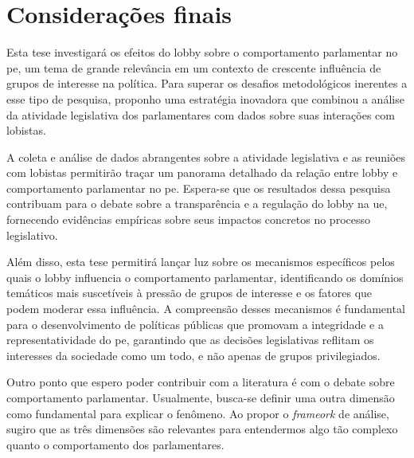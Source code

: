 \chapter{Considerações finais}
\label{chapter:considfinal}

Esta tese investigará os efeitos do lobby sobre o comportamento parlamentar no \acrshort{pe}, um tema de grande relevância em um contexto de crescente influência de grupos de interesse na política. Para superar os desafios metodológicos inerentes a esse tipo de pesquisa, proponho uma estratégia inovadora que combinou a análise da atividade legislativa dos parlamentares com dados sobre suas interações com lobistas.

A coleta e análise de dados abrangentes sobre a atividade legislativa e as reuniões com lobistas permitirão traçar um panorama detalhado da relação entre lobby e comportamento parlamentar no \acrshort{pe}. Espera-se que os resultados dessa pesquisa contribuam para o debate sobre a transparência e a regulação do lobby na \acrshort{ue}, fornecendo evidências empíricas sobre seus impactos concretos no processo legislativo.

Além disso, esta tese permitirá lançar luz sobre os mecanismos específicos pelos quais o lobby influencia o comportamento parlamentar, identificando os domínios temáticos mais suscetíveis à pressão de grupos de interesse e os fatores que podem moderar essa influência. A compreensão desses mecanismos é fundamental para o desenvolvimento de políticas públicas que promovam a integridade e a representatividade do \acrshort{pe}, garantindo que as decisões legislativas reflitam os interesses da sociedade como um todo, e não apenas de grupos privilegiados.

Outro ponto que espero poder contribuir com a literatura é com o debate sobre comportamento parlamentar. Usualmente, busca-se definir uma outra dimensão como fundamental para explicar o fenômeno. Ao propor o \textit{frameork} de análise, sugiro que as três dimensões são relevantes para entendermos algo tão complexo quanto o comportamento dos parlamentares.
